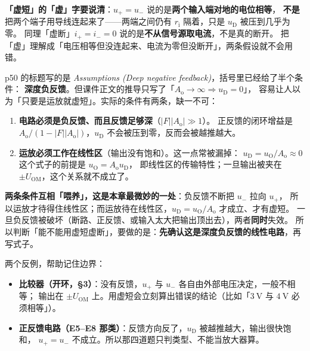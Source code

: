 \documentclass[11pt]{ctexart}
\begin{document}
\begin{wbx}
\textbf{「虚短」的「虚」字要说清}：$u_+=u_-$ 说的是\textbf{两个输入端对地的电位相等}，
\textbf{不是}把两个端子用导线连起来了——两端之间仍有 $r_{\mathrm{i}}$ 隔着，只是 $u_{\mathrm{D}}$ 被压到几乎为零。
同理「虚断」$i_+=i_-=0$ 说的是\textbf{不从信号源取电流}，不是真的断开。
把「虚」理解成「电压相等但没连起来、电流为零但没断开」，两条假设就不会用错。
\end{wbx}


p50 的标题写的是 \textit{Assumptions (Deep negative feedback)}，括号里已经给了半个条件：
\textbf{深度负反馈}。但课件正文的推导只写了「$A_{\mathrm{o}}\to\infty\Rightarrow u_{\mathrm{D}}=0$」，
容易让人以为「只要是运放就虚短」。实际的条件有两条，缺一不可：

\begin{enumerate}
\item \textbf{电路必须是负反馈、而且反馈足够深}（$|F||A_{\mathrm{o}}|\gg1$）。
正反馈的闭环增益是 $A_{\mathrm{o}}/(1-|F||A_{\mathrm{o}}|)$，$u_{\mathrm{D}}$ 不会被压到零，反而会被越推越大。
\item \textbf{运放必须工作在线性区}（输出没有饱和）。这一点常被漏掉：
$u_{\mathrm{D}}=u_{\mathrm{O}}/A_{\mathrm{o}}\approx0$ 这个式子的前提是 $u_{\mathrm{O}}=A_{\mathrm{o}}u_{\mathrm{D}}$，
即线性区的传输特性；一旦输出被夹在 $\pm U_{\mathrm{OM}}$，这个关系就不成立了。
\end{enumerate}

\begin{wbx}
\textbf{两条条件互相「喂养」，这是本章最微妙的一处}：负反馈不断把 $u_-$ 拉向 $u_+$，
所以运放才待得住线性区；而运放待在线性区，$u_{\mathrm{D}}=u_{\mathrm{O}}/A_{\mathrm{o}}$ 才成立、才有虚短。
一旦负反馈被破坏（断路、正反馈、或输入太大把输出顶出去），两者\textbf{同时}失效。
所以判断「能不能用虚短虚断」，要做的是：\textbf{先确认这是深度负反馈的线性电路}，再写式子。
\end{wbx}

两个反例，帮助记住边界：

\begin{itemize}
\item \textbf{比较器（开环，§3）}：没有反馈，$u_+$ 与 $u_-$ 各自由外部电压决定，一般不相等；
输出在 $\pm U_{\mathrm{OM}}$ 上。用虚短会立刻算出错误的结论（比如「$3\ \mathrm{V}$ 与 $4\ \mathrm{V}$ 必须相等」）。
\item \textbf{正反馈电路（E5--E8 那类）}：反馈方向反了，$u_{\mathrm{D}}$ 被越推越大，输出很快饱和，
$u_+=u_-$ 不成立。所以那四道题只判类型、不能当放大器算。
\end{itemize}
\end{document}
